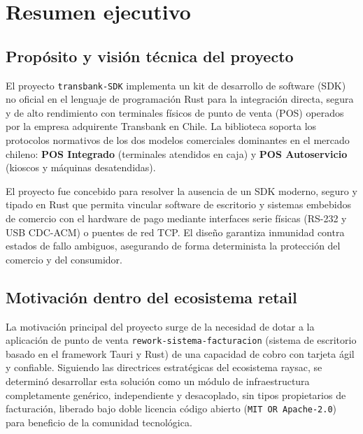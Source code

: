 \documentclass{../../plantilla/raysac-informe}
\begin{document}
\portada

\begin{controlversiones}
\end{controlversiones}

\avisolegalestandar

\clearpage
\preliminares

\section{Resumen ejecutivo}

\subsection{Propósito y visión técnica del proyecto}
El proyecto \texttt{transbank-SDK} implementa un kit de desarrollo de software (SDK) no oficial en el
lenguaje de programación Rust para la integración directa, segura y de alto rendimiento con terminales
físicos de punto de venta (POS) operados por la empresa adquirente Transbank en Chile. La biblioteca
soporta los protocolos normativos de los dos modelos comerciales dominantes en el mercado chileno:
\textbf{POS Integrado} (terminales atendidos en caja) y \textbf{POS Autoservicio} (kioscos y máquinas
desatendidas).

El proyecto fue concebido para resolver la ausencia de un SDK moderno, seguro y tipado en Rust que
permita vincular software de escritorio y sistemas embebidos de comercio con el hardware de pago
mediante interfaces serie físicas (RS-232 y USB CDC-ACM) o puentes de red TCP. El diseño garantiza
inmunidad contra estados de fallo ambiguos, asegurando de forma determinista la protección del
comercio y del consumidor.

\subsection{Motivación dentro del ecosistema retail}
La motivación principal del proyecto surge de la necesidad de dotar a la aplicación de punto de venta
\texttt{rework-sistema-facturacion} (sistema de escritorio basado en el framework Tauri y Rust) de una
capacidad de cobro con tarjeta ágil y confiable. Siguiendo las directrices estratégicas del ecosistema
raysac, se determinó desarrollar esta solución como un módulo de infraestructura completamente genérico,
independiente y desacoplado, sin tipos propietarios de facturación, liberado bajo doble licencia
código abierto (\texttt{MIT OR Apache-2.0}) para beneficio de la comunidad tecnológica.
\end{document}
